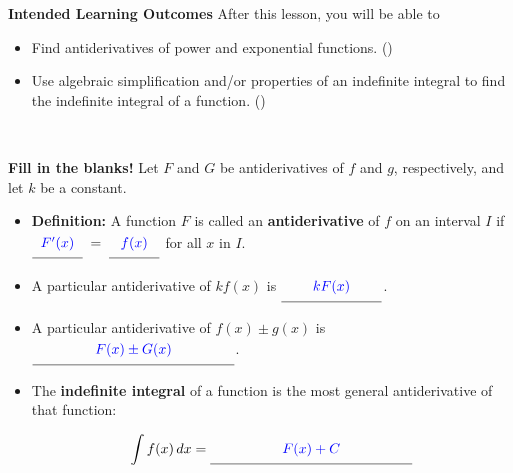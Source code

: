 \documentclass[10pt]{article}
\begin{document}
\pagestyle{otherpages}
\thispagestyle{firstpage}

\textbf{Intended Learning Outcomes}
After this lesson, you will be able to 

\begin{itemize}
    \item Find antiderivatives of power and exponential functions. ()
    \item Use algebraic simplification and/or properties of an indefinite integral to find the indefinite integral of a function. ()
\end{itemize}

\vspace{-0.6cm}

\hrulefill\\


{\bf\color{blue} Fill in the blanks!} Let $F$ and $G$ be antiderivatives of $f$ and $g$, respectively, and let $k$ be a constant.

\begin{itemize}

\item {\bf Definition:} A function $F$ is called an {\bf antiderivative} of $f$ on an interval $I$ if $\unlineb{.5}{F^{\prime}(x)} \;=\; \unlineb{.5}{f(x)}$ for all $x$ in $I$.\\

\item A particular antiderivative of $kf(x)$ is \dotfill $\unlineb{1}{kF(x)}$.\\

\item A particular antiderivative of $f(x)\pm g(x)$ is \dotfill $\unlineb{2}{F(x)\pm G(x)}$.\\

\item The {\bf indefinite integral} of a function is the most general antiderivative of that function: 

\[\dint f(x)\,dx = \unlineb{2}{F(x)+C}\]

\end{itemize}

\

\hrulefill

\

\end{document}
